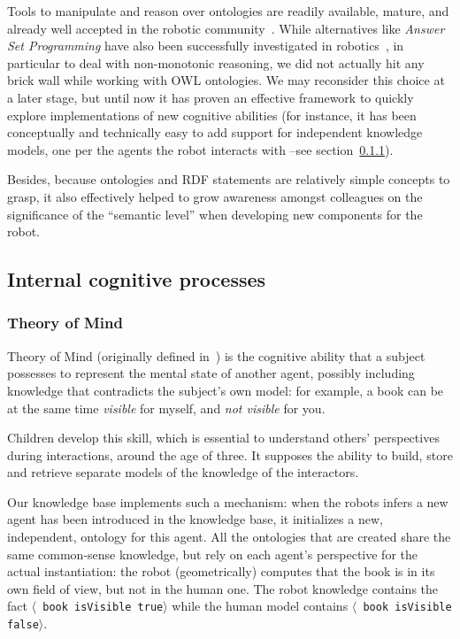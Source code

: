 \documentclass[preprint,12pt]{elsarticle}
\newcommand{\stmt}[1]{{\footnotesize \tt $\langle$ #1\relax$\rangle$}}
\begin{document}
Tools to manipulate and reason over ontologies are readily available, mature,
and already well accepted in the robotic community~\cite{Tenorth2009a,
Lim2011}. While alternatives like \emph{Answer Set Programming} have also been
successfully investigated in robotics~\cite{Chen2010,Erdem2012}, in particular
to deal with non-monotonic reasoning, we did not actually hit any brick wall
while working with OWL ontologies. We may reconsider this choice at a later
stage, but until now it has proven an effective framework to quickly explore
implementations of new cognitive abilities (for instance, it has been
conceptually and technically easy to add support for independent knowledge
models, one per the agents the robot interacts with --see
section~\ref{sect|tom}).

Besides, because ontologies and RDF statements are relatively simple concepts
to grasp, it also effectively helped to grow awareness amongst colleagues on
the significance of the ``semantic level'' when developing new components for
the robot.

\subsection{Internal cognitive processes}
\label{sect|intern}

\subsubsection{Theory of Mind}
\label{sect|tom}

Theory of Mind (originally defined in~\cite{Premack1978}) is the cognitive
ability that a subject possesses to represent the mental state of another
agent, possibly including knowledge that contradicts the subject's own model: for
example, a book can be at the same time \emph{visible} for myself, and \emph{not
visible} for you.

Children develop this skill, which is essential to understand others' perspectives during
interactions, around the age of three. It supposes the
ability to build, store and retrieve separate models of the knowledge of the
interactors.

Our knowledge base implements such a mechanism: when the robots infers a new
agent has been introduced in the knowledge base, it initializes a new,
independent, ontology for this agent. All the ontologies that are created share
the same common-sense knowledge, but rely on each agent's perspective for the
actual instantiation: the robot (geometrically) computes that the book is in
its own field of view, but not in the human one. The robot knowledge contains
the fact \stmt{book isVisible true} while the human model contains \stmt{book
isVisible false}.
\end{document}
